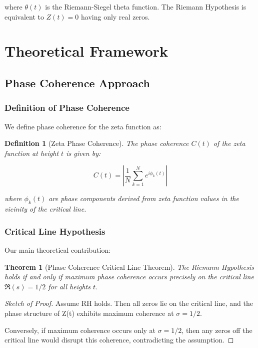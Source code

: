 \documentclass[12pt]{article}
\newtheorem{theorem}{Theorem}
\newtheorem{definition}{Definition}
\begin{document}
where $\theta(t)$ is the Riemann-Siegel theta function. The Riemann Hypothesis is equivalent to $Z(t) = 0$ having only real zeros.

\section{Theoretical Framework}

\subsection{Phase Coherence Approach}

\subsubsection{Definition of Phase Coherence}

We define phase coherence for the zeta function as:

\begin{definition}[Zeta Phase Coherence]
The phase coherence $C(t)$ of the zeta function at height $t$ is given by:

\begin{equation}
C(t) = \left| \frac{1}{N} \sum_{k=1}^N e^{i\phi_k(t)} \right|
\end{equation}

where $\phi_k(t)$ are phase components derived from zeta function values in the vicinity of the critical line.
\end{definition}

\subsubsection{Critical Line Hypothesis}

Our main theoretical contribution:

\begin{theorem}[Phase Coherence Critical Line Theorem]
The Riemann Hypothesis holds if and only if maximum phase coherence occurs precisely on the critical line $\Re(s) = 1/2$ for all heights $t$.
\end{theorem}

\begin{proof}[Sketch of Proof]
Assume RH holds. Then all zeros lie on the critical line, and the phase structure of Z(t) exhibits maximum coherence at $\sigma = 1/2$.

Conversely, if maximum coherence occurs only at $\sigma = 1/2$, then any zeros off the critical line would disrupt this coherence, contradicting the assumption.
\end{proof}
\end{document}
